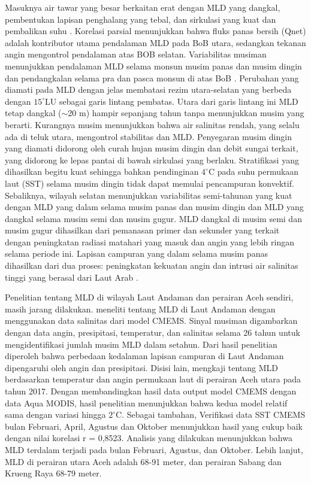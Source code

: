 \begin{spacing}{1.5}
	Masuknya air tawar yang besar berkaitan erat dengan MLD yang dangkal, pembentukan lapisan penghalang yang tebal, dan sirkulasi yang kuat dan pembalikan suhu . 	Korelasi parsial menunjukkan bahwa fluks panas bersih (Qnet) adalah kontributor utama pendalaman MLD pada BoB utara, sedangkan tekanan angin mengontrol pendalaman atas BOB selatan. Variabilitas musiman menunjukkan pendalaman MLD selama monsun musim panas dan musim dingin dan pendangkalan selama pra dan pasca monsun di atas BoB . Perubahan yang diamati pada MLD dengan jelas membatasi rezim utara-selatan yang berbeda dengan $15^\circ$LU sebagai garis lintang pembatas. Utara dari garis lintang ini MLD tetap dangkal ($\sim$20 m) hampir sepanjang tahun tanpa menunjukkan musim yang berarti. Kurangnya musim menunjukkan bahwa air salinitas rendah, yang selalu ada di teluk utara, mengontrol stabilitas dan MLD. Penyegaran musim dingin yang diamati didorong oleh curah hujan musim dingin dan debit sungai terkait, yang didorong ke lepas pantai di bawah sirkulasi yang berlaku. Stratifikasi yang dihasilkan begitu kuat sehingga bahkan pendinginan $4^\circ$C pada suhu permukaan laut (SST) selama musim dingin tidak dapat memulai pencampuran konvektif. Sebaliknya, wilayah selatan menunjukkan variabilitas semi-tahunan yang kuat dengan MLD yang dalam selama musim panas dan musim dingin dan MLD yang dangkal selama musim semi dan musim gugur. MLD dangkal di musim semi dan musim gugur dihasilkan dari pemanasan primer dan sekunder yang terkait dengan peningkatan radiasi matahari yang masuk dan angin yang lebih ringan selama periode ini. Lapisan campuran yang dalam selama musim panas dihasilkan dari dua proses: peningkatan kekuatan angin dan intrusi air salinitas tinggi yang berasal dari Laut Arab .
	
	Penelitian tentang MLD di wilayah Laut Andaman dan perairan Aceh sendiri, masih jarang dilakukan.  meneliti tentang MLD di Laut Andaman dengan menggunakan data salinitas dari model CMEMS. Sinyal musiman digambarkan dengan data angin, presipitasi, temperatur, dan salinitas selama 26 tahun untuk mengidentifikasi jumlah musim MLD dalam setahun. Dari hasil penelitian diperoleh bahwa perbedaan kedalaman lapisan campuran di Laut Andaman dipengaruhi oleh angin dan presipitasi. Disisi lain,  mengkaji tentang MLD berdasarkan temperatur dan angin permukaan laut di perairan Aceh utara pada tahun 2017. Dengan membandingkan hasil data output model CMEMS dengan data Aqua MODIS, hasil penelitian menunjukkan bahwa kedua model relatif sama dengan variasi hingga $2^\circ$C. Sebagai tambahan, Verifikasi data SST CMEMS bulan Februari, April, Agustus dan Oktober menunjukkan hasil yang cukup baik dengan nilai korelasi r = 0,8523. Analisis yang dilakukan menunjukkan bahwa MLD terdalam terjadi pada bulan Februari, Agustus, dan Oktober. Lebih lanjut, MLD di perairan utara Aceh adalah 68-91 meter, dan perairan Sabang dan Krueng Raya 68-79 meter. 
	

\end{spacing}
